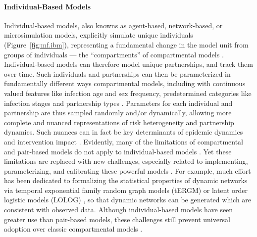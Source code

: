 \paragraph{Individual-Based Models}
Individual-based models, also knowns as agent-based, network-based, or microsimulation models,
explicitly simulate unique individuals (Figure~\ref{fig:mf.ibm}),
representing a fundamental change in the model unit from groups of individuals
--- \ie the ``compartments'' of compartmental models \cite{Rao2021}.
Individual-based models can therefore model unique partnerships, and track them over time.
Such individuals and partnerships can then be
parameterized in fundamentally different ways \vs compartmental models,
including with continuous valued features like infection age and sex frequency,
\vs predetermined categories like infection stages and partnership types \cite{Pellis2015,Rao2021}.
Parameters for each individual and partnership are thus sampled randomly and/or dynamically,
allowing more complete and nuanced representations of risk heterogeneity and partnership dynamics.
Such nuances can in fact be key determinants of epidemic dynamics and intervention impact
\cite{Hontelez2013,Johnson2016a}.
Evidently, many of the limitations of compartmental and pair-based models
do not apply to individual-based models \cite{Rao2021}.
Yet these limitations are replaced with new challenges,
especially related to implementing, parameterizing, and calibrating these powerful models
\cite{Rao2021,Pellis2015,Hazelbag2020}.
For example, much effort has been dedicated to
formalizing the statistical properties of dynamic networks
via temporal exponential family random graph models (tERGM) \cite{Jenness2018}
or latent order logistic models (LOLOG) \cite{Clark2022},
so that dynamic networks can be generated which are consistent with observed data.
Although individual-based models have seen greater use than pair-based models,
these challenges still prevent universal adoption over classic compartmental models \cite{Rao2021}.

